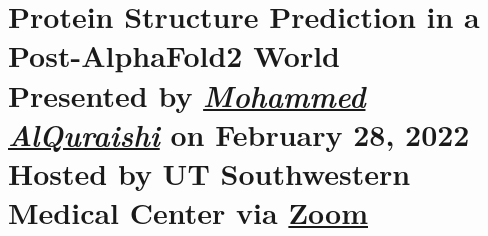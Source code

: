 \documentclass[hidelinks,11pt]{article}
\begin{document}

\section*{\centering Protein Structure Prediction in a Post-AlphaFold2 World\\\small Presented by \emph{\href{https://systemsbiology.columbia.edu/faculty/mohammed-alquraishi}{Mohammed AlQuraishi}} on February 28, 2022\\Hosted by UT Southwestern Medical Center via \href{https://events.utsouthwestern.edu/event/computational_bio_seminar_mohammed_alquraishi_phd_csb}{Zoom}}
\end{document}
